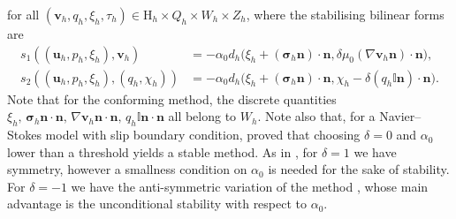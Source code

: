 \documentclass[onefignum,onetabnum,reqno,a4paper,final]{siamart250211}
\newcommand\bu{\boldsymbol{u}}
\newcommand\bv{\boldsymbol{v}}
\newcommand\bn{\boldsymbol{n}}
\newcommand\0{\mathbf{0}}
\newcommand\bsig{\boldsymbol{\sigma}}
\newcommand\bH{\boldsymbol{\mathrm{H}}}
\numberwithin{figure}{section}
\numberwithin{table}{section}
\begin{document}
	for all $(\bv_h,q_h,\xi_h,\tau_h)\in \bH_h \times Q_h\times W_h\times Z_h$, where the stabilising  bilinear forms are 
	$$
	\begin{aligned}
		s_1((\bu_h,p_h,\xi_h),\bv_h)&=-\alpha_0d_h\bigl(\xi_h+ (\bsig_h\bn)\cdot\bn, \delta \mu_0(\nabla\bv_h\bn)\cdot\bn\bigr), \\
		s_2((\bu_h,p_h,\xi_h),(q_h,\chi_h))&=-\alpha_0d_h\bigl(\xi_h+(\bsig_h\bn)\cdot\bn,\chi_h-\delta(q_h\mathbb{I}\bn)\cdot\bn\bigr).
	\end{aligned}
	$$
	Note that for the conforming method, 
	the discrete quantities $\xi_h,\,\bsig_h\bn\cdot \bn,\, \nabla\bv_h\bn\cdot \bn,\, q_h\mathbb{I}\bn\cdot\bn$ all belong to $W_h$. 
	Note also that, for a Navier--Stokes model with slip boundary condition, \cite{verfurth91} proved that choosing $\delta=0$ and $\alpha_0$ lower than a threshold yields a stable method. As in  \cite{hughes1989new}, for $\delta=1$  we have symmetry, however a smallness condition on $\alpha_0$ is needed for the sake of  stability. For $\delta=-1$ we have the anti-symmetric variation of the method \cite{franca1991error,barbosa1992boundary}, whose main advantage is the unconditional stability with respect to $\alpha_0$. 
	
\end{document}
